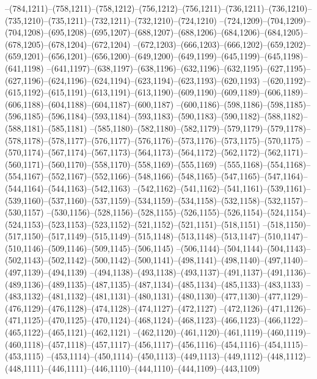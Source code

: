 --(784,1211)--(758,1211)--(758,1212)--(756,1212)--(756,1211)--(736,1211)--(736,1210)--(735,1210)--(735,1211)--(732,1211)--(732,1210)--(724,1210)
--(724,1209)--(704,1209)--(704,1208)--(695,1208)--(695,1207)--(688,1207)--(688,1206)--(684,1206)--(684,1205)--(678,1205)--(678,1204)--(672,1204)
--(672,1203)--(666,1203)--(666,1202)--(659,1202)--(659,1201)--(656,1201)--(656,1200)--(649,1200)--(649,1199)--(645,1199)--(645,1198)--(641,1198)
--(641,1197)--(638,1197)--(638,1196)--(632,1196)--(632,1195)--(627,1195)--(627,1196)--(624,1196)--(624,1194)--(623,1194)--(623,1193)--(620,1193)
--(620,1192)--(615,1192)--(615,1191)--(613,1191)--(613,1190)--(609,1190)--(609,1189)--(606,1189)--(606,1188)--(604,1188)--(604,1187)--(600,1187)
--(600,1186)--(598,1186)--(598,1185)--(596,1185)--(596,1184)--(593,1184)--(593,1183)--(590,1183)--(590,1182)--(588,1182)--(588,1181)--(585,1181)
--(585,1180)--(582,1180)--(582,1179)--(579,1179)--(579,1178)--(578,1178)--(578,1177)--(576,1177)--(576,1176)--(573,1176)--(573,1175)--(570,1175)
--(570,1174)--(567,1174)--(567,1173)--(564,1173)--(564,1172)--(562,1172)--(562,1171)--(560,1171)--(560,1170)--(558,1170)--(558,1169)--(555,1169)
--(555,1168)--(554,1168)--(554,1167)--(552,1167)--(552,1166)--(548,1166)--(548,1165)--(547,1165)--(547,1164)--(544,1164)--(544,1163)--(542,1163)
--(542,1162)--(541,1162)--(541,1161)--(539,1161)--(539,1160)--(537,1160)--(537,1159)--(534,1159)--(534,1158)--(532,1158)--(532,1157)--(530,1157)
--(530,1156)--(528,1156)--(528,1155)--(526,1155)--(526,1154)--(524,1154)--(524,1153)--(523,1153)--(523,1152)--(521,1152)--(521,1151)--(518,1151)
--(518,1150)--(517,1150)--(517,1149)--(515,1149)--(515,1148)--(513,1148)--(513,1147)--(510,1147)--(510,1146)--(509,1146)--(509,1145)--(506,1145)
--(506,1144)--(504,1144)--(504,1143)--(502,1143)--(502,1142)--(500,1142)--(500,1141)--(498,1141)--(498,1140)--(497,1140)--(497,1139)--(494,1139)
--(494,1138)--(493,1138)--(493,1137)--(491,1137)--(491,1136)--(489,1136)--(489,1135)--(487,1135)--(487,1134)--(485,1134)--(485,1133)--(483,1133)
--(483,1132)--(481,1132)--(481,1131)--(480,1131)--(480,1130)--(477,1130)--(477,1129)--(476,1129)--(476,1128)--(474,1128)--(474,1127)--(472,1127)
--(472,1126)--(471,1126)--(471,1125)--(470,1125)--(470,1124)--(468,1124)--(468,1123)--(466,1123)--(466,1122)--(465,1122)--(465,1121)--(462,1121)
--(462,1120)--(461,1120)--(461,1119)--(460,1119)--(460,1118)--(457,1118)--(457,1117)--(456,1117)--(456,1116)--(454,1116)--(454,1115)--(453,1115)
--(453,1114)--(450,1114)--(450,1113)--(449,1113)--(449,1112)--(448,1112)--(448,1111)--(446,1111)--(446,1110)--(444,1110)--(444,1109)--(443,1109)
